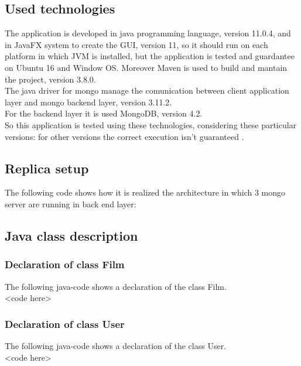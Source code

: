 \documentclass[a4paper, oneside]{article}
\begin{document}
\subsection{Used technologies}
The application is developed in java programming language, version 11.0.4, and in JavaFX system to create the GUI, version 11, so it should run on each platform in which JVM is installed, but the application is tested and guardantee on Ubuntu 16 and Window OS. Moreover Maven is used  to build and mantain the project, version 3.8.0. \\
The java driver for mongo manage the comunication between client application layer and mongo backend layer, version 3.11.2.\\ 
For the backend layer it is used MongoDB, version 4.2.\\
So this application is tested using these technologies, considering these particular versions: for other versions the correct execution isn't guaranteed .\\

\subsection{Replica setup}
The following code shows how it is realized the architecture in which 3 mongo server are running in back end layer:
\vspace{2mm}

\vspace{5mm}
\subsection{Java class description}
\subsubsection{Declaration of class Film}
The following java-code shows a declaration of the class Film.
\vspace{2mm}
\\ <code here>
\vspace{5mm}

\subsubsection{Declaration of class User}
The following java-code shows a declaration of the class User.
\vspace{2mm}
	\\ <code here>
\vspace{5mm}
\end{document}
